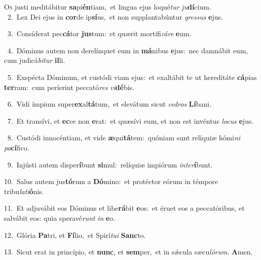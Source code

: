 \lettrine{\initial\textcolor{\initialcolor}{O}}{s} justi meditábitur \textbf{sa}\-pi\-\textbf{én}\-tiam,~\star et lingua ejus loqué\textit{tur} \textit{ju}\-\textbf{dí}cium.\\
{\numbfont\textcolor{\numbcolor}{~2.}}~Lex Dei ejus in \textbf{cor}\-de ip\-\textbf{sí}\-us,~\star et non supplantabúntur \textit{gres}\-\textit{sus} \textbf{e}\-jus.\par
{\numbfont\textcolor{\numbcolor}{~3.}}~Consíderat pec\-\textbf{cá}\-tor \textbf{jus}\-tum:~\star et quærit mortifi\-\textit{cá}\-\textit{re} \textbf{e}\-um.\par
{\numbfont\textcolor{\numbcolor}{~4.}}~Dóminus autem non derelínquet eum in \textbf{má}\-nibus \textbf{e}\-jus:~\star nec damnábit eum, cum judicá\-\textit{bi}\-\textit{tur} \textbf{il}\-li.\par
{\numbfont\textcolor{\numbcolor}{~5.}}~Exspécta Dóminum, et custódi viam ejus:~\dagger et exaltábit te ut hereditáte \textbf{cá}\-pias \textbf{ter}\-ram:~\star cum períerint peccató\textit{res} \textit{vi}\-\textbf{dé}bis.\par
{\numbfont\textcolor{\numbcolor}{~6.}}~Vidi ímpium super\-\textbf{ex}\-al\-\textbf{tá}\-tum,~\star et elevátum sicut \textit{ce}\-\textit{dros} \textbf{Lí}\-bani.\par
{\numbfont\textcolor{\numbcolor}{~7.}}~Et transívi, et \textbf{ec}\-ce non \textbf{e}\-rat:~\star et quæsívi eum, et non est invéntus \textit{lo}\-\textit{cus} \textbf{e}\-jus.\par
{\numbfont\textcolor{\numbcolor}{~8.}}~Custódi innocéntiam, et vide \textbf{æ}\-qui\-\textbf{tá}\-tem:~\star quóniam sunt relíquiæ hómi\textit{ni} \textit{pa}\-\textbf{cí}fico.\par
{\numbfont\textcolor{\numbcolor}{~9.}}~Injústi autem disper\-\textbf{í}\-bunt \textbf{si}\-mul:~\star relíquiæ impiórum \textit{in}\-\textit{ter}\textbf{í}bunt.\par
{\numbfont\textcolor{\numbcolor}{10.}}~Salus autem jus\-\textbf{tó}\-rum a \textbf{Dó}\-mino:~\star et protéctor eórum in témpore tribu\-\textit{la}\-\textit{ti}\textbf{ó}nis.\par
{\numbfont\textcolor{\numbcolor}{11.}}~Et adjuvábit eos Dóminus et libe\-\textbf{rá}\-bit \textbf{e}\-os:~\star et éruet eos a peccatóribus, et salvábit eos: quia speravé\textit{runt} \textit{in} \textbf{e}\-o.\par
{\numbfont\textcolor{\numbcolor}{12.}}~Glória \textbf{Pa}\-tri, et \textbf{Fí}\-lio,~\star et Spirí\-\textit{tu}\-\textit{i} \textbf{Sanc}\-to.\par
{\numbfont\textcolor{\numbcolor}{13.}}~Sicut erat in princípio, et \textbf{nunc}\-, et \textbf{sem}\-per,~\star et in sǽcula sæcu\-\textit{ló}\-\textit{rum}. \textbf{A}\-men.\par
